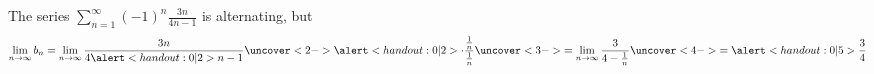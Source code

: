 \begin{frame}
\begin{example} %
The series $\sum_{n=1}^\infty (-1)^n \frac{3n}{4n-1}$ is alternating, but
\[
\lim_{n\to\infty} b_n = \lim_{n\to\infty} \frac{3n}{4\alert<handout:0| 2>{n}-1}\uncover<2->{\alert<handout:0| 2>{\cdot \frac{\frac{1}{n}}{\frac{1}{n}}}}%
\uncover<3->{%
 = \lim_{n\to\infty} \frac{3}{4-\frac{1}{n}}%
}%
\uncover<4->{%
 = \alert<handout:0| 5>{\frac{3}{4}}%
}%
\]
\end{example}
\end{frame}
